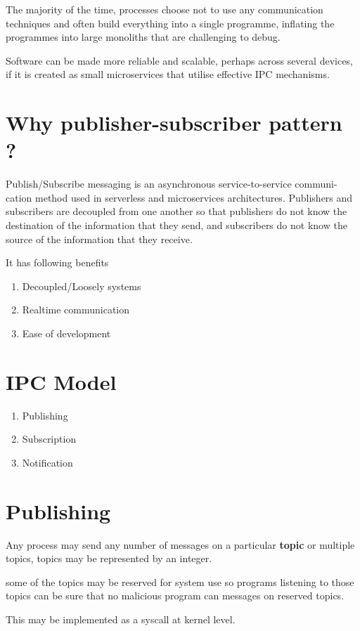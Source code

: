 \documentclass[12pt]{report}
\begin{document}
	The majority of the time, processes choose not to use any communication techniques 
	and often build everything into a single programme, inflating the programmes 
	into large monoliths that are challenging to debug.
	
	Software can be made more reliable and scalable, perhaps across several devices, 
	if it is created as small microservices that utilise effective IPC mechanisms.
	
	\section{Why publisher-subscriber pattern ?}
    Publish/Subscribe messaging is an asynchronous service-to-service communi-
    cation method used in serverless and microservices architectures. Publishers
    and subscribers are decoupled from one another so that publishers do not
    know the destination of the information that they send, and subscribers do
    not know the source of the information that they receive.

    It has following benefits
	\begin{enumerate}
		\item Decoupled/Loosely systems
		\item Real\-time communication
		\item Ease of development
	\end{enumerate}
	
	\section{IPC Model}
	\begin{enumerate}
		\item Publishing
		\item Subscription
		\item Notification
	\end{enumerate}
	
	\section{Publishing}
	Any process may send any number of messages on a particular \textbf{topic} or 
	multiple topics, topics may be represented by an integer.

	some of the topics may be reserved for system use so programs listening to those
	topics can be sure that no malicious program can messages on reserved topics.
	
	This may be implemented as a syscall at kernel level.
				 	
\end{document}
